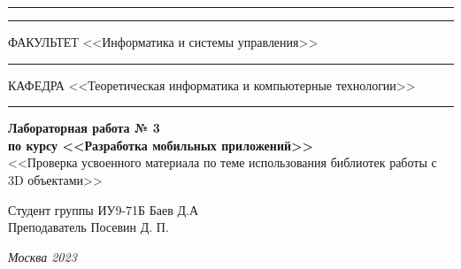 \documentclass[a4paper, 14pt]{extarticle}
\begin{document}
\begin{titlepage}
\vspace{-25pt}
\hspace{-35pt}\rule{\textwidth}{2.3pt}

\vspace*{-20.3pt}
\hspace{-35pt}\rule{\textwidth}{0.4pt}

\vspace{1.5ex}
\hspace{-35pt} \noindent \small ФАКУЛЬТЕТ\hspace{80pt} <<Информатика и системы управления>>

\vspace*{-16pt}
\hspace{47pt}\rule{0.83\textwidth}{0.4pt}

\vspace{0.5ex}
\hspace{-35pt} \noindent \small КАФЕДРА\hspace{50pt} <<Теоретическая информатика и компьютерные технологии>>

\vspace*{-16pt}
\hspace{30pt}\rule{0.866\textwidth}{0.4pt}
  
\vspace{11em}

\begin{center}
\Large {\bf Лабораторная работа № 3} \\ 
\large {\bf по курсу <<Разработка мобильных приложений>>} \\
\large <<Проверка усвоенного материала по теме  
использования библиотек  работы с 3D объектами>> 
\end{center}\normalsize

\vspace{8em}


\begin{flushright}
  {Студент группы ИУ9-71Б Баев Д.А \hspace*{15pt}\\ 
  \vspace{2ex}
  Преподаватель Посевин Д. П.\hspace*{15pt}}
\end{flushright}

\bigskip

\vfill
 

\begin{center}
\textsl{Москва 2023}
\end{center}
\end{titlepage}
\end{document}
